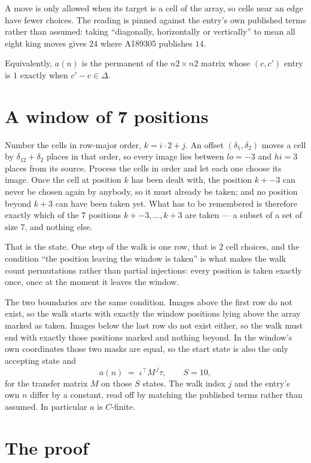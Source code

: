\documentclass[11pt,a4paper]{article}
\theoremstyle{plain}
\theoremstyle{definition}
\begin{document}
A move is only allowed when its target is a cell of the array, so cells near an
edge have fewer choices. The reading is pinned against the entry's own published terms rather
than assumed: taking ``diagonally, horizontally or vertically'' to mean all eight king moves
gives $24$ where A189305 publishes $14$.

Equivalently, $a(n)$ is the permanent of the $n2\times n2$ matrix whose $(c,c')$ entry is
$1$ exactly when $c'-c\in\Delta$.

\section{A window of 7 positions}

Number the cells in row-major order, $k=i\cdot2+j$. An offset $(\delta_1,\delta_2)$ moves a
cell by $\delta_12+\delta_2$ places in that order, so every image lies between $lo=-3$ and
$hi=3$ places from its source. Process the cells in order and let each one choose its image.
Once the cell at position $k$ has been dealt with, the position $k+-3$ can never be chosen
again by anybody, so it must already be taken; and no position beyond $k+3$ can have been
taken yet. What has to be remembered is therefore exactly which of the $7$ positions
$k+-3,\dots,k+3$ are taken --- a subset of a set of size $7$, and nothing else.

That is the state. One step of the walk is one row, that is $2$ cell choices, and the
condition ``the position leaving the window is taken'' is what makes the walk count permutations
rather than partial injections: every position is taken exactly once, once at the moment it
leaves the window.

The two boundaries are the same condition. Images above the first row do not exist, so the walk
starts with exactly the window positions lying above the array marked as taken. Images below the
last row do not exist either, so the walk must end with exactly those positions marked and
nothing beyond. In the window's own coordinates those two masks are equal, so the start state is
also the only accepting state and
\[
a(n)\;=\;\iota^{\!\top}M^{\,j}\tau ,\qquad S=10,
\]
for the transfer matrix $M$ on those $S$ states. The walk index $j$ and the entry's own $n$
differ by a constant, read off by matching the published terms rather than assumed. In
particular $a$ is $C$-finite.

\section{The proof}
\end{document}
